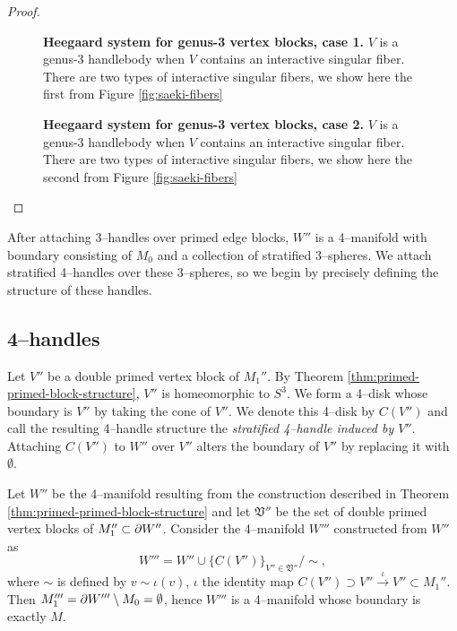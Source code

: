\begin{proof}
	
	\begin{figure}[h!]
		\caption{
			\textbf{Heegaard system for genus-3 vertex blocks, case 1.}
			$V$ is a genus-3 handlebody when $V$ contains an interactive singular fiber.
			There are two types of interactive singular fibers, we show here the first from Figure \ref{fig:saeki-fibers}
		}
		\label{fig:heegaard-genus-3-1}
	\end{figure}
	
	
	\begin{figure}[h!]
		\caption{
			\textbf{Heegaard system for genus-3 vertex blocks, case 2.}
			$V$ is a genus-3 handlebody when $V$ contains an interactive singular fiber.
			There are two types of interactive singular fibers, we show here the second from Figure \ref{fig:saeki-fibers}
		}
		\label{fig:heegaard-genus-3-2}
	\end{figure}	
\end{proof}

After attaching 3--handles over primed edge blocks, $W''$ is a 4--manifold with boundary consisting of $M_0$ and a collection of stratified 3--spheres.
We attach stratified 4--handles over these 3--spheres, so we begin by precisely defining the structure of these handles.

\subsection{4--handles}
Let $V''$ be a double primed vertex block of $M_1''$.
By Theorem \ref{thm:primed-primed-block-structure}, $V''$ is homeomorphic to $S^3$.
We form a 4--disk whose boundary is $V''$ by taking the cone of $V''$.
We denote this 4--disk by $C(V'')$ and call the resulting 4--handle structure the \emph{stratified 4--handle induced by $V''$}.
Attaching $C(V'')$ to $W''$ over $V''$ alters the boundary of $V''$ by replacing it with $\emptyset$.

\begin{cor}
	Let $W''$ be the 4--manifold resulting from the construction described in Theorem \ref{thm:primed-primed-block-structure} and let $\mathfrak{V}''$ be the set of double primed vertex blocks of $M_1''\subset\partial W''$.
	Consider the 4--manifold $W'''$ constructed from $W''$ as
	\[
	W''' = W''\cup\{C(V'')\}_{V''\in \mathfrak{V}''} / \sim,
	\]
	where $\sim$ is defined by $v\sim \iota(v)$, $\iota$ the identity map $C(V'')\supset V''\overset{\iota}{\to} V''\subset M_1''$.
	Then $M_1'''=\partial W'''\setminus M_0=\emptyset$, hence $W'''$ is a 4--manifold whose boundary is exactly $M$.
\end{cor}


